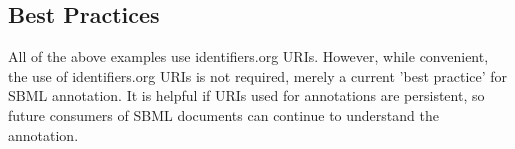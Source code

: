 \begin{blockChanged}
\subsection{Best Practices}
All of the above examples use identifiers.org URIs.  However, while convenient, the use of identifiers.org URIs is not required, merely a current 'best practice' for SBML annotation.  It is helpful if URIs used for annotations are persistent, so future consumers of SBML documents can continue to understand the annotation.
\end{blockChanged}

